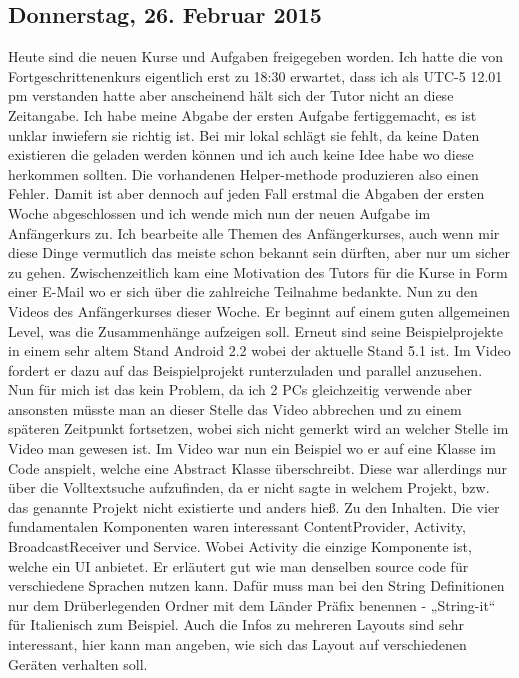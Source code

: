 \documentclass[12pt,a4paper,bibliography=totocnumbered,listof=totocnumbered]{scrartcl}
\begin{document}
\subsection{Donnerstag, 26. Februar 2015}
Heute sind die neuen Kurse und Aufgaben freigegeben worden. Ich hatte die von Fortgeschrittenenkurs eigentlich erst zu 18:30 erwartet, dass ich als UTC-5 12.01 pm verstanden hatte aber anscheinend hält sich der Tutor nicht an diese Zeitangabe.
Ich habe meine Abgabe der ersten Aufgabe fertiggemacht, es ist unklar inwiefern sie richtig ist. Bei mir lokal schlägt sie fehlt, da keine Daten existieren die geladen werden können und ich auch keine Idee habe wo diese herkommen sollten. Die vorhandenen Helper-methode produzieren also einen Fehler. Damit ist aber dennoch auf jeden Fall erstmal die Abgaben der ersten Woche abgeschlossen und ich wende mich nun der neuen Aufgabe im Anfängerkurs zu.
Ich bearbeite alle Themen des Anfängerkurses, auch wenn mir diese Dinge vermutlich das meiste schon bekannt sein dürften, aber nur um sicher zu gehen. 
Zwischenzeitlich kam eine Motivation des Tutors für die Kurse in Form einer E-Mail wo er sich über die zahlreiche Teilnahme bedankte.
Nun zu den Videos des Anfängerkurses dieser Woche.
Er beginnt auf einem guten allgemeinen Level, was die Zusammenhänge aufzeigen soll. 
Erneut sind seine Beispielprojekte in einem sehr altem Stand Android 2.2 wobei der aktuelle Stand 5.1 ist. Im Video fordert er dazu auf das Beispielprojekt runterzuladen und parallel anzusehen. Nun für mich ist das kein Problem, da ich 2 PCs gleichzeitig verwende aber ansonsten müsste man an dieser Stelle das Video abbrechen und zu einem späteren Zeitpunkt fortsetzen, wobei sich nicht gemerkt wird an welcher Stelle im Video man gewesen ist. Im Video war nun ein Beispiel wo er auf eine Klasse im Code anspielt, welche eine Abstract Klasse überschreibt. Diese war allerdings nur über die Volltextsuche aufzufinden, da er nicht sagte in welchem Projekt, bzw. das genannte Projekt nicht existierte und anders hieß. 
Zu den Inhalten.
Die vier fundamentalen Komponenten waren interessant ContentProvider, Activity, BroadcastReceiver und Service. Wobei Activity die einzige Komponente ist, welche ein UI anbietet. Er erläutert gut wie man denselben source code für verschiedene Sprachen nutzen kann. Dafür muss man bei den String Definitionen nur dem Drüberlegenden Ordner mit dem Länder Präfix benennen - „String-it“ für Italienisch zum Beispiel. 
Auch die Infos zu mehreren Layouts sind sehr interessant, hier kann man angeben, wie sich das Layout auf verschiedenen Geräten verhalten soll. 
\end{document}
